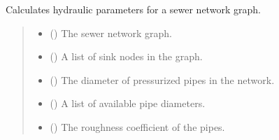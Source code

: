 \documentclass[letterpaper,10pt,english]{sphinxmanual}
\begin{document}
\begin{fulllineitems}
\label{\detokenize{pysewer:pysewer.optimization.calculate_hydraulic_parameters}}
\pysigstartsignatures
{}
\pysigstopsignatures
\sphinxAtStartPar
Calculates hydraulic parameters for a sewer network graph.
\begin{quote}\begin{description}
\begin{itemize}
\item {} 
\sphinxAtStartPar
{} () \textendash{} The sewer network graph.

\item {} 
\sphinxAtStartPar
{} () \textendash{} A list of sink nodes in the graph.

\item {} 
\sphinxAtStartPar
{} () \textendash{} The diameter of pressurized pipes in the network.

\item {} 
\sphinxAtStartPar
{} () \textendash{} A list of available pipe diameters.

\item {} 
\sphinxAtStartPar
{} () \textendash{} The roughness coefficient of the pipes.


\end{itemize}
\end{description}
\end{quote}
\end{fulllineitems}
\end{document}
